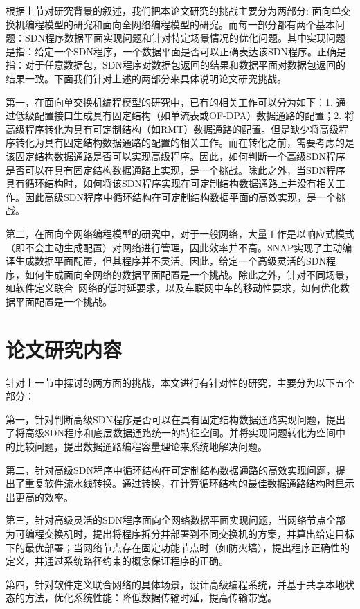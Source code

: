 \documentclass{ctexart}
\begin{document}
根据上节对研究背景的叙述，我们把本论文研究的挑战主要分为两部分: 面向单交换机编程模型的研究和面向全网络编程模型的研究。而每一部分都有两个基本问题：SDN程序数据平面实现问题和针对特定场景情况的优化问题。其中实现问题是指：给定一个SDN程序，一个数据平面是否可以正确表达该SDN程序。正确是指：对于任意数据包，SDN程序对数据包返回的结果和数据平面对数据包返回的结果一致。下面我们针对上述的两部分来具体说明论文研究挑战。

第一，在面向单交换机编程模型的研究中，已有的相关工作可以分为如下：1. 通过低级配置接口生成具有固定结构（如单流表或OF-DPA）数据通路的配置；2. 将高级程序转化为具有可定制结构（如RMT）数据通路的配置。但是缺少将高级程序转化为具有固定结构数据通路的配置的相关工作。而在转化之前，需要考虑的是该固定结构数据通路是否可以实现高级程序。因此，如何判断一个高级SDN程序是否可以在具有固定结构数据通路上实现，是一个挑战。除此之外，当SDN程序具有循环结构时，如何将该SDN程序实现在可定制结构数据通路上并没有相关工作。因此高级SDN程序中循环结构在可定制结构数据平面的高效实现，是一个挑战。

第二，在面向全网络编程模型的研究中，对于一般网络，大量工作是以响应式模式（即不会主动生成配置）对网络进行管理，因此效率并不高。SNAP实现了主动编译生成数据平面配置，但其程序并不灵活。因此，给定一个高级灵活的SDN程序，如何生成面向全网络的数据平面配置是一个挑战。除此之外，针对不同场景，如软件定义联合~\cite{mishra2017comparing}网络的低时延要求，以及车联网中车的移动性要求，如何优化数据平面配置是一个挑战。

\section{论文研究内容}

针对上一节中探讨的两方面的挑战，本文进行有针对性的研究，主要分为以下五个部分：

第一，针对判断高级SDN程序是否可以在具有固定结构数据通路实现问题，提出了将高级SDN程序和底层数据通路统一的特征空间。并将实现问题转化为空间中的比较问题，提出数据通路编程容量理论来系统地解决问题。

第二，针对高级SDN程序中循环结构在可定制结构数据通路的高效实现问题，提出了重复软件流水线转换。通过转换，在计算循环结构的最佳数据通路结构时显示出更高的效率。

第三，针对高级灵活的SDN程序面向全网络数据平面实现问题，当网络节点全部为可编程交换机时，提出将程序拆分并部署到不同交换机的方案，并算出给定目标下的最优部署；当网络节点存在固定功能节点时（如防火墙），提出程序正确性的定义，并通过系统路径约束的概念保证程序的正确。

第四，针对软件定义联合网络的具体场景，设计高级编程系统，并基于共享本地状态的方法，优化系统性能：降低数据传输时延，提高传输带宽。
\end{document}
